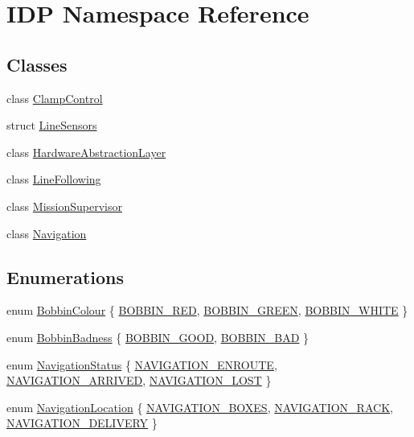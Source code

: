 \hypertarget{namespaceIDP}{
\section{IDP Namespace Reference}
\label{namespaceIDP}
}
\subsection*{Classes}
\begin{DoxyCompactItemize}
\item 
class \hyperlink{classIDP_1_1ClampControl}{ClampControl}
\item 
struct \hyperlink{structIDP_1_1LineSensors}{LineSensors}
\item 
class \hyperlink{classIDP_1_1HardwareAbstractionLayer}{HardwareAbstractionLayer}
\item 
class \hyperlink{classIDP_1_1LineFollowing}{LineFollowing}
\item 
class \hyperlink{classIDP_1_1MissionSupervisor}{MissionSupervisor}
\item 
class \hyperlink{classIDP_1_1Navigation}{Navigation}
\end{DoxyCompactItemize}
\subsection*{Enumerations}
\begin{DoxyCompactItemize}
\item 
enum \hyperlink{namespaceIDP_a6efd2cca14c0dae1c6458714ce0218df}{BobbinColour} \{ \hyperlink{namespaceIDP_a6efd2cca14c0dae1c6458714ce0218dfa1bbb59488c1d089eefb9b54146bcdb26}{BOBBIN\_\-RED}, 
\hyperlink{namespaceIDP_a6efd2cca14c0dae1c6458714ce0218dfa047d7c5fcd5669f1a819d05fb5319f0b}{BOBBIN\_\-GREEN}, 
\hyperlink{namespaceIDP_a6efd2cca14c0dae1c6458714ce0218dfa8f427bfb1c335650a7ada595e1607d00}{BOBBIN\_\-WHITE}
 \}
\item 
enum \hyperlink{namespaceIDP_adf12b2c1e1c228810b18c34a3c88c32d}{BobbinBadness} \{ \hyperlink{namespaceIDP_adf12b2c1e1c228810b18c34a3c88c32dafdc1b8b5a9d849fd99ac2ae438b632dd}{BOBBIN\_\-GOOD}, 
\hyperlink{namespaceIDP_adf12b2c1e1c228810b18c34a3c88c32da6cb4993a316e9d4dc9836d3d990fd0f6}{BOBBIN\_\-BAD}
 \}
\item 
enum \hyperlink{namespaceIDP_a1a96e566e4d675fdf20780cc96d92283}{NavigationStatus} \{ \hyperlink{namespaceIDP_a1a96e566e4d675fdf20780cc96d92283a9f52fe7970aefcb1b74e9aea3798f39d}{NAVIGATION\_\-ENROUTE}, 
\hyperlink{namespaceIDP_a1a96e566e4d675fdf20780cc96d92283ab9e83c995cb23a5782b23b198dcbabcb}{NAVIGATION\_\-ARRIVED}, 
\hyperlink{namespaceIDP_a1a96e566e4d675fdf20780cc96d92283ad75d1c5522e0a38dbe62266912d411ba}{NAVIGATION\_\-LOST}
 \}
\item 
enum \hyperlink{namespaceIDP_ab9c412f0fd539b5d70385066c30465a0}{NavigationLocation} \{ \hyperlink{namespaceIDP_ab9c412f0fd539b5d70385066c30465a0a0cfb642ce5e4133706998843eb3c8da1}{NAVIGATION\_\-BOXES}, 
\hyperlink{namespaceIDP_ab9c412f0fd539b5d70385066c30465a0af1bde0912725a75705d0fb74637f20c1}{NAVIGATION\_\-RACK}, 
\hyperlink{namespaceIDP_ab9c412f0fd539b5d70385066c30465a0a10e09a3f2969d951f0dc233cb76eb4bf}{NAVIGATION\_\-DELIVERY}
 \}
\end{DoxyCompactItemize}
